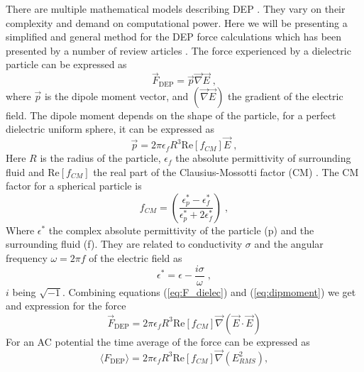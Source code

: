 \documentclass[final]{jyflluk}
\begin{document}
There are multiple mathematical models describing DEP \cite{jubery_dielectrophoretic_2014}. They vary on their complexity and demand on computational power. Here we will be presenting a simplified and general method for the DEP force calculations which has been presented by a number of review articles \cite{voldman_electrical_2006, li_review_2014, cottet_mydep_2019, morgan_single_2007}. The force experienced by a dielectric particle can be expressed as
%
\begin{equation}
   \label{eq:F_dielec}
   \vec{F}_{\mathrm{DEP}} = \vec{p} \vec{\nabla} \vec{E}\;,
\end{equation}
%
where $\vec{p}$  is the dipole moment vector, and $(\vec{\nabla} \vec{E})$ the gradient of the electric field. The dipole moment depends on the shape of the particle, for a perfect dielectric uniform sphere, it can be expressed as
%
\begin{equation}
   \label{eq:dipmoment}
   \vec{p} = 2 \pi \epsilon_f R^3 \mathrm{Re}[f_{CM}] \vec{E}\;,
\end{equation}
%
Here $R$ is the radius of the particle, $\epsilon_{f}$ the absolute permittivity of surrounding fluid and $\mathrm{Re}[f_{CM}]$ the real part of the Clausius-Mossotti factor (CM) \cite{li_review_2014}. The CM factor for a spherical particle is
%
\begin{equation}
   \label{eq:CM}
   f_{CM} = \left(\frac{\epsilon_{p}^* - \epsilon_{f}^*}{\epsilon_{p}^* + 2\epsilon_{f}^*} \right)\;,
\end{equation}
%
Where $\epsilon^*$ the complex absolute permittivity of the particle (p) and the surrounding fluid (f). They are related to conductivity $\sigma$ and the angular frequency $\omega=2\pi f$ of the electric field as 
%
\begin{equation}
   \label{eq:complex}
   \epsilon^* = \epsilon - \frac{i \sigma}{\omega}\;,
\end{equation}
%
$i$ being $\sqrt{-1}$. Combining equations (\ref{eq:F_dielec}) and (\ref{eq:dipmoment}) we get and expression for the force
%
\begin{equation}
   \label{eq:F_DEP_norm}
   \vec{F}_{\mathrm{DEP}} = 2 \pi \epsilon_f R^3 \mathrm{Re}[f_{CM}] \vec{\nabla} (\vec{E} \cdot \vec{E}) 
\end{equation}
%
For an AC potential the time average of the force can be expressed as
%
\begin{equation}
   \label{eq:F_DEP}
   \langle F_{\mathrm{DEP}}\rangle = 2 \pi \epsilon_f R^3 \mathrm{Re}[f_{CM}] \vec{\nabla} (E^2_{RMS}) ,
\end{equation}
\end{document}
